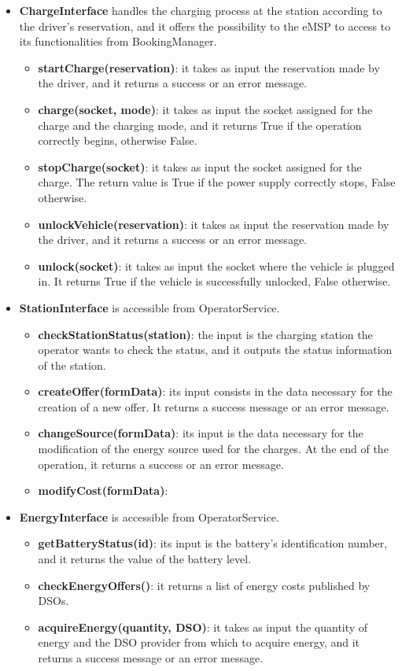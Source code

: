 \documentclass[../main.tex]{subfiles}
\begin{document}
\begin{itemize}
    \item \textbf{ChargeInterface} handles the charging process at the station according to the driver's reservation, and it offers the possibility to the eMSP to access to its functionalities from BookingManager.
    \begin{itemize}
        \item \textbf{startCharge(reservation)}: it takes as input the reservation made by the driver, and it returns a success or an error message.
        \item \textbf{charge(socket, mode)}: it takes as input the socket assigned for the charge and the charging mode, and it returns True if the operation correctly begins, otherwise False. 
        \item \textbf{stopCharge(socket)}: it takes as input the socket assigned for the charge. The return value is True if the power supply correctly stops, False otherwise.
        \item \textbf{unlockVehicle(reservation)}: it takes as input the reservation made by the driver, and it returns a success or an error message. 
        \item \textbf{unlock(socket)}: it takes as input the socket where the vehicle is plugged in. It returns True if the vehicle is successfully unlocked, False otherwise.
    \end{itemize}

    \item \textbf{StationInterface} is accessible from OperatorService. 
    \begin{itemize}
        \item \textbf{checkStationStatus(station)}: the input is the charging station the operator wants to check the status, and it outputs the status information of the station.
        \item \textbf{createOffer(formData)}: its input consists in the data necessary for the creation of a new offer. It returns a success message or an error message.
        \item \textbf{changeSource(formData)}: its input is the data necessary for the modification of the energy source used for the charges. At the end of the operation, it returns a success or an error message.
        \item \textbf{modifyCost(formData)}: 
    \end{itemize}

    \item \textbf{EnergyInterface} is accessible from OperatorService.
    \begin{itemize}
        \item \textbf{getBatteryStatus(id)}: its input is the battery's identification number, and it returns the value of the battery level.
        \item \textbf{checkEnergyOffers()}: it returns a list of energy costs published by DSOs.
        \item \textbf{acquireEnergy(quantity, DSO)}: it takes as input the quantity of energy and the DSO provider from which to acquire energy, and it returns a success message or an error message.
    \end{itemize}


\end{itemize}
\end{document}
